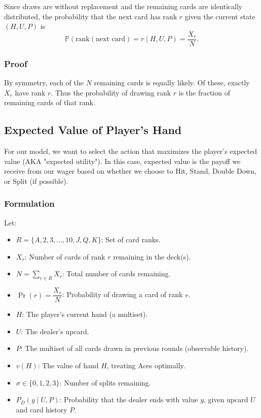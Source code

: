 \documentclass[12pt,a4paper]{cibb}
\begin{document}
Since draws are without replacement and the remaining cards are identically distributed, the probability that the next card has rank \(r\) given the current state \((H,U,P)\) is
\[
  \mathbb{P}(\mathrm{rank}(\text{next card}) = r \mid H, U, P)
  = \frac{X_r}{N}.
\]

\subsubsection{Proof}

By symmetry, each of the $N$ remaining cards is equally likely. Of these, exactly $X_r$ have rank $r$. 
Thus the probability of drawing rank $r$ is the fraction of remaining cards of that rank. 

\subsection{Expected Value of Player's Hand}
\label{sec:Expected Value}
For our model, we want to select the action that maximizes the player's expected value (AKA "expected utility").
In this case, expected value is the payoff we receive from our wager based on whether we choose to Hit, Stand, Double Down, or Split (if possible). 

\subsubsection{Formulation}

Let:
\begin{itemize}
    \item \( R = \{A, 2, 3, \dots, 10, J, Q, K\} \): Set of card ranks.
    \item \( X_r \): Number of cards of rank \(r\) remaining in the deck(s). 
    \item \( N = \sum_{r \in R} X_r \): Total number of cards remaining. 
    \item \( \Pr(r) = \dfrac{X_r}{N} \): Probability of drawing a card of rank \(r\). 
    \item \( H \): The player's current hand (a multiset).
    \item \( U \): The dealer's upcard.
    \item \( P \): The multiset of all cards drawn in previous rounds (observable history).
    \item \( v(H) \): The value of hand \(H\), treating Aces optimally.
    \item \( σ \in \{0,1,2,3\} \): Number of splits remaining.
    \item \( P_D(y \mid U, P) \): Probability that the dealer ends with value \(y\), given upcard \(U\) and card history \(P\).
\end{itemize}
\end{document}
